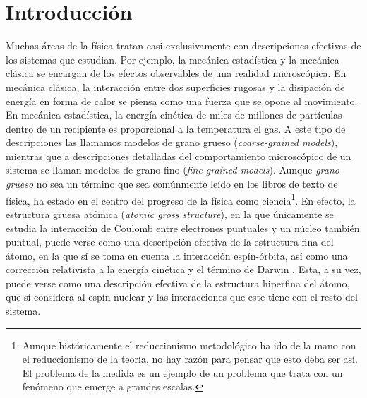 \chapter{Introducción}



Muchas áreas de la física tratan casi exclusivamente con descripciones efectivas de los sistemas que estudian. Por ejemplo, la mecánica estadística y la mecánica clásica se encargan de los efectos observables de una realidad microscópica. En mecánica clásica, la interacción entre dos superficies rugosas y la disipación de energía en forma de calor se piensa como una fuerza que se opone al movimiento. En mecánica estadística, la energía cinética de miles de millones de partículas dentro de un recipiente es proporcional a la temperatura el gas. A este tipo de descripciones las llamamos modelos de grano grueso (\textit{coarse-grained models}), mientras que a descripciones detalladas del comportamiento microscópico de un sistema se llaman modelos de grano fino (\textit{fine-grained models}). Aunque \textit{grano grueso} no sea un término que sea comúnmente leído en los libros de texto de física, ha estado en el centro del progreso de la física como ciencia\footnote{Aunque históricamente el reduccionismo metodológico ha ido de la mano con el reduccionismo de la teoría, no hay razón para pensar que esto deba ser así. El problema de la medida es un ejemplo de un problema que trata con un fenómeno que emerge a grandes escalas.}. En efecto, la estructura gruesa atómica (\textit{atomic gross structure}), en la que únicamente se estudia la interacción de Coulomb entre electrones puntuales y un núcleo también puntual, puede verse como una descripción efectiva de la estructura fina del átomo, en la que sí se toma en cuenta la interacción espín-órbita, así como una corrección relativista a la energía cinética y el término de Darwin \cite{Bransden}. Esta, a su vez, puede verse como una descripción efectiva de la estructura hiperfina del átomo, que sí considera al espín nuclear y las interacciones que este tiene con el resto del sistema.


